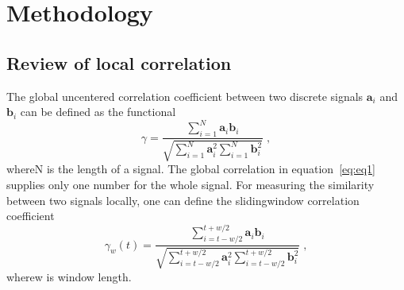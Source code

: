 \section{Methodology}

 \subsection{Review of local correlation}

The global uncentered correlation coefficient between two discrete
signals $\mathbf{a}_i$ and $\mathbf{b}_i$ can be defined as the functional
      \begin{equation}
          \gamma = \frac{\displaystyle\sum_{i=1}^{N}\mathbf{a}_i \mathbf{b}_i}{\sqrt{\displaystyle\sum_{i=1}^{N}\mathbf{a}^2_i \sum_{i=1}^{N}\mathbf{b}^2_i}}\;,
        \label{eq:eq1}
      \end{equation}
whereN is the length of a signal. The global correlation in equation~\ref{eq:eq1}
supplies only one number for the whole signal. For measuring the
similarity between two signals locally, one can define the slidingwindow
correlation coefficient
      \begin{equation}
          \gamma_w(t) = \frac{\displaystyle\sum_{i=t-w/2}^{t+w/2} \mathbf{a}_i \mathbf{b}_i}{\sqrt{\displaystyle\sum_{i=t-w/2}^{t+w/2} \mathbf{a}_i^2 \displaystyle\sum_{i=t-w/2}^{t+w/2} \mathbf{b}_i^2 }}\;,
        \label{eq:eq2}
      \end{equation}
wherew is window length.

